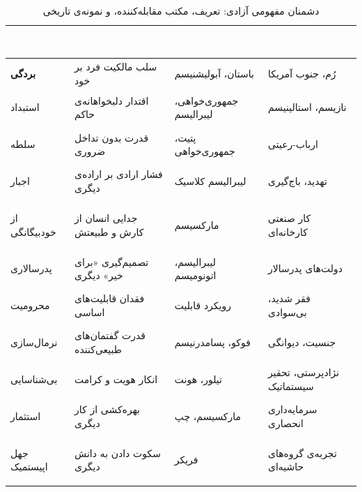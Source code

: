 \begin{table}[h!]
\centering
\caption{دشمنان مفهومی آزادی: تعریف، مکتب مقابله‌کننده، و نمونه‌ی تاریخی}
\label{tab:enemies}
\renewcommand{\arraystretch}{1.5}

\begin{tabularx}{\textwidth}{|>{\bfseries\color{AccentRed}}p{2.3cm}
  |>{\raggedright}X|>{\raggedright}X|>{\raggedright\arraybackslash}X|}

\hline
\rowcolor{AccentRed!80}
\textcolor{white}{\textbf{دشمن مفهومی}} &
\textcolor{white}{\textbf{تعریف}} &
\textcolor{white}{\textbf{مکتب مقابله‌کننده}} &
\textcolor{white}{\textbf{نمونه‌ی تاریخی}} \\
\hline

\rowcolor{red!5}
بردگی & سلب مالکیت فرد بر خود & باستان، آبولیشنیسم & رُم، جنوب آمریکا \\
\hline

استبداد & اقتدار دلبخواهانه‌ی حاکم & جمهوری‌خواهی، لیبرالیسم & نازیسم، استالینیسم \\
\hline

\rowcolor{red!5}
سلطه & قدرت بدون تداخل ضروری & پتیت، جمهوری‌خواهی & ارباب-رعیتی \\
\hline

اجبار & فشار ارادی بر اراده‌ی دیگری & لیبرالیسم کلاسیک & تهدید، باج‌گیری \\
\hline

\rowcolor{red!5}
از خودبیگانگی & جدایی انسان از کارش و طبیعتش & مارکسیسم & کار صنعتی کارخانه‌ای \\
\hline

پدرسالاری & تصمیم‌گیری «برای خیر» دیگری & لیبرالیسم، اتونومیسم & دولت‌های پدرسالار \\
\hline

\rowcolor{red!5}
محرومیت & فقدان قابلیت‌های اساسی & رویکرد قابلیت & فقر شدید، بی‌سوادی \\
\hline

نرمال‌سازی & قدرت گفتمان‌های طبیعی‌کننده & فوکو، پسامدرنیسم & جنسیت، دیوانگی \\
\hline

\rowcolor{red!5}
بی‌شناسایی & انکار هویت و کرامت & تیلور، هونت & نژادپرستی، تحقیر سیستماتیک \\
\hline

استثمار & بهره‌کشی از کار دیگری & مارکسیسم، چپ & سرمایه‌داری انحصاری \\
\hline

\rowcolor{red!5}
جهل اپیستمیک & سکوت دادن به دانش دیگری & فریکر & تجربه‌ی گروه‌های حاشیه‌ای \\
\hline

\end{tabularx}
\end{table}

\newpage
